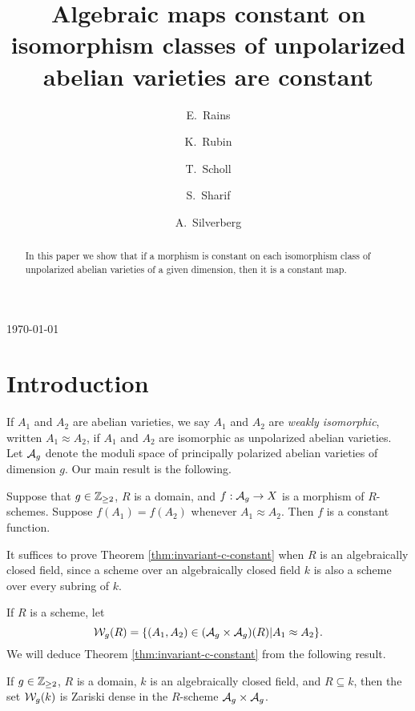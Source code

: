 \documentclass{amsart}
\title[Algebraic maps constant on unpolarized isomorphism classes]{Algebraic maps constant on isomorphism classes of unpolarized abelian varieties are constant}
\author[E.\ Rains]{E.\ Rains}
\author[K.\ Rubin]{K.\ Rubin}
\author[T.\ Scholl]{T.\ Scholl}
\author[S.\ Sharif]{S.\ Sharif}
\author[A.\ Silverberg]{A.\ Silverberg}
\begin{document}
\begin{abstract}
In this paper we show that if a morphism is constant on each isomorphism class of unpolarized abelian varieties of a given dimension, then it is a constant map. 
\end{abstract}


\today
\maketitle



\section{Introduction}
\label{sec:introduction}

If $A_1$ and $A_2$ are abelian varieties, we say $A_1$ and $A_2$ are \emph{weakly isomorphic}, written $A_1 \approx A_2$, if $A_1$ and $A_2$ are isomorphic as unpolarized abelian varieties. Let $\mathcal{A}_g$ denote the moduli space of principally polarized abelian varieties of dimension $g$. Our main result is the following.
\begin{theorem}\label{thm:invariant-c-constant}
  Suppose that $g\in\mathbb{Z}_{\ge 2}$, $R$ is a domain, and $f: \mathcal{A}_g \to X$ is a morphism of $R$-schemes. Suppose $f(A_1) = f(A_2)$ whenever $A_1 \approx A_2$. Then $f$ is a constant function.
\end{theorem}

It suffices to prove Theorem \ref{thm:invariant-c-constant} when $R$ is an algebraically closed field, since a scheme over an algebraically closed field $k$ is also a scheme over every subring of $k$.




If $R$ is a scheme, let
$$
\mathcal{W}_g(R) = \{(A_1,A_2) \in (\mathcal{A}_g \times \mathcal{A}_g)(R) | A_1 \approx A_2\}.
$$
We will deduce Theorem \ref{thm:invariant-c-constant} from the following result.

\begin{theorem}\label{thm:sg-c-dense}
  If $g\in\mathbb{Z}_{\ge 2}$, $R$ is a domain, $k$ is an algebraically closed field, and $R \subseteq k$, then the set $\mathcal{W}_g(k)$ is Zariski dense in the $R$-scheme $\mathcal{A}_g \times \mathcal{A}_g$.
\end{theorem}
\end{document}
